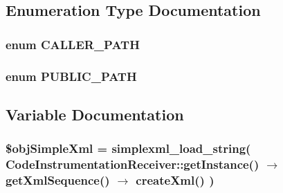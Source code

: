 \subsection{Enumeration Type Documentation}
\hypertarget{code_instrumentation_2example_2test1_8php_58763391df8832eea0c173fe59e5c977}{
\subsubsection[{CALLER\_\-PATH}]{\setlength{\rightskip}{0pt plus 5cm}enum {\bf CALLER\_\-PATH}}}
\label{code_instrumentation_2example_2test1_8php_58763391df8832eea0c173fe59e5c977}


\hypertarget{code_instrumentation_2example_2test1_8php_b72f88470e4eee5518bfc7c908101d80}{
\subsubsection[{PUBLIC\_\-PATH}]{\setlength{\rightskip}{0pt plus 5cm}enum {\bf PUBLIC\_\-PATH}}}
\label{code_instrumentation_2example_2test1_8php_b72f88470e4eee5518bfc7c908101d80}




\subsection{Variable Documentation}
\hypertarget{code_instrumentation_2example_2test1_8php_da23b058075209c6506f7b0b1bb0d5bf}{
\subsubsection[{\$objSimpleXml}]{\setlength{\rightskip}{0pt plus 5cm}\$objSimpleXml = simplexml\_\-load\_\-string( CodeInstrumentationReceiver::getInstance() $\rightarrow$ getXmlSequence() $\rightarrow$ createXml() )}}
\label{code_instrumentation_2example_2test1_8php_da23b058075209c6506f7b0b1bb0d5bf}


